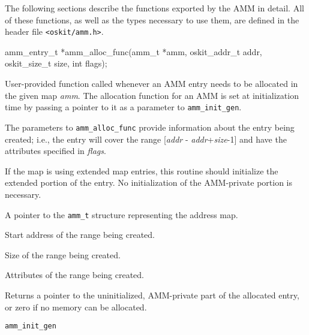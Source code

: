 The following sections describe the functions exported by the AMM in detail.
All of these functions, as well as the types necessary to use them,
are defined in the header file {\tt <oskit/amm.h>}.

\begin{apisyn}

	\funcproto amm_entry_t *amm_alloc_func(amm_t *amm,
				oskit_addr_t addr, oskit_size_t size, int flags);
\end{apisyn}
\begin{apidesc}
	User-provided function called whenever an AMM entry needs to be
	allocated in the given map \emph{amm}.
	The allocation function for an AMM is set at initialization time
	by passing a pointer to it as a parameter to {\tt amm_init_gen}.

	The parameters to {\tt amm_alloc_func}
	provide information about the entry being
	created; i.e., the entry will cover the range
	[\emph{addr} - \emph{addr}+\emph{size}-1] and have the attributes
	specified in \emph{flags}.

	If the map is using extended map entries,
	this routine should initialize the extended portion of the entry.
	No initialization of the AMM-private portion is necessary.
\end{apidesc}
\begin{apiparm}
	\item[amm]
		A pointer to the {\tt amm_t} structure
		representing the address map.
	\item[addr]
		Start address of the range being created.
	\item[size]
		Size of the range being created.
	\item[flags]
		Attributes of the range being created.
\end{apiparm}
\begin{apiret}
	Returns a pointer to the uninitialized,
	AMM-private part of the allocated entry,
	or zero if no memory can be allocated.
\end{apiret}
\begin{apirel}
	{\tt amm_init_gen}
\end{apirel}


